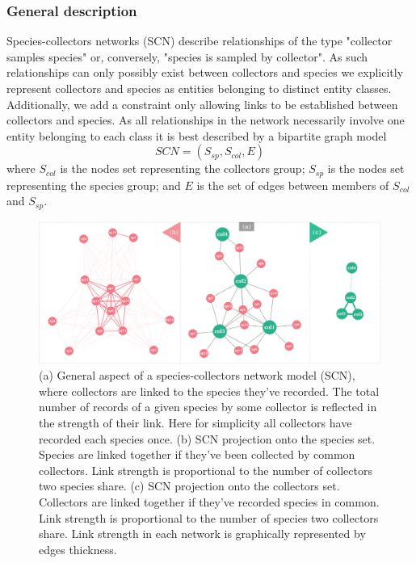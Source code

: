 \documentclass[a4paper]{article}
\begin{document}



\subsubsection{General description}

Species-collectors networks (SCN) describe relationships of the type "collector samples species" or, conversely, "species is sampled by collector". 
As such relationships can only possibly exist between collectors and species we explicitly represent collectors and species as entities belonging to distinct entity classes. Additionally, we add a constraint only allowing links to be established between collectors and species.
As all relationships in the network necessarily involve one entity belonging to each class it is best described by a bipartite graph model
$$ SCN = (S_{sp},S_{col},E)$$
where $S_{col}$ is the nodes set representing the collectors group; $S_{sp}$ is the nodes set representing the species group; and $E$ is the set of edges between members of $S_{col}$ and $S_{sp}$.

  \begin{figure}[h!]
  	\centering
    \includegraphics[width=\linewidth]{figures/scn_generalaspect.png}
    \caption{(a) General aspect of a species-collectors network model (SCN), where collectors are linked to the species they've recorded. The total number of records of a given species by some collector is reflected in the strength of their link. Here for simplicity all collectors have recorded each species once. (b) SCN projection onto the species set. Species are linked together if they've been collected by common collectors. Link strength is proportional to the number of collectors two species share. (c) SCN projection onto the collectors set. Collectors are linked together if they've recorded species in common. Link strength is proportional to the number of species two collectors share. Link strength in each network is graphically represented by edges thickness.}
    \label{fig:scn_general}
  \end{figure}
\end{document}
